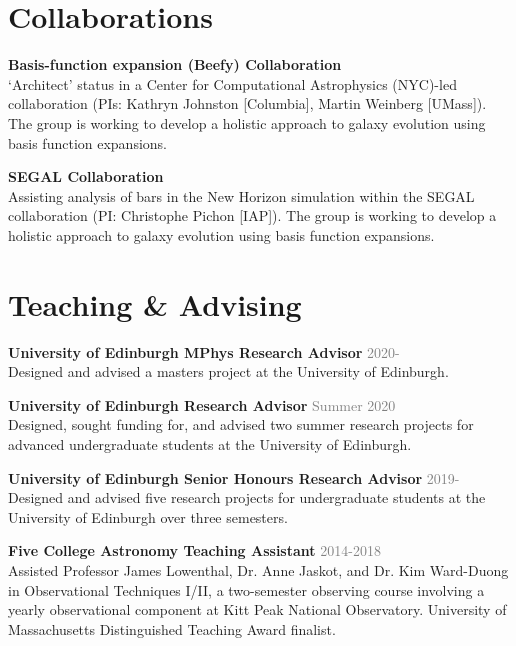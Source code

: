 \documentclass[margin, a4paper,11pt]{res} %
\begin{document}
\begin{resume}
\section{\sc \textcolor{redshade}{Collaborations}}

{\bf Basis-function expansion (Beefy) Collaboration} \\
`Architect' status in a Center for Computational Astrophysics (NYC)-led collaboration (PIs: Kathryn Johnston [Columbia], Martin Weinberg [UMass]). The group is working to develop a holistic approach to galaxy evolution using basis function expansions.

{\bf SEGAL Collaboration} \\
Assisting analysis of bars in the New Horizon simulation within the SEGAL collaboration (PI: Christophe Pichon [IAP]). The group is working to develop a holistic approach to galaxy evolution using basis function expansions.



\section{\sc \textcolor{redshade}{Teaching \& Advising}}

{\bf University of Edinburgh MPhys Research Advisor} \hfill\textcolor{grey}{2020-}\\
Designed and advised a masters project at the University of Edinburgh.

{\bf University of Edinburgh Research Advisor} \hfill\textcolor{grey}{Summer 2020}\\
Designed, sought funding for, and advised two summer research projects for advanced undergraduate students at the University of Edinburgh.

{\bf University of Edinburgh Senior Honours Research Advisor} \hfill\textcolor{grey}{2019-}\\
Designed and advised five research projects for undergraduate students
at the University of Edinburgh over three semesters.

{\bf Five College Astronomy Teaching Assistant} \hfill \textcolor{grey}{2014-2018}\\
Assisted Professor James Lowenthal, Dr. Anne Jaskot, and Dr. Kim Ward-Duong in Observational Techniques I/II, a two-semester observing course involving a yearly observational component at Kitt Peak National Observatory. University of Massachusetts Distinguished Teaching Award finalist.


\end{resume}
\end{document}
